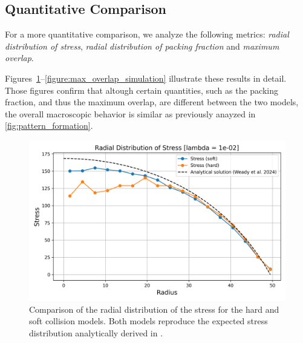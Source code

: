 \documentclass[conference]{IEEEtran}
\begin{document}
\cite{You2018}


\newpage

\subsection{Quantitative Comparison}

For a more quantitative comparison, we analyze the following metrics: \textit{radial distribution of stress}, \textit{radial distribution of packing fraction} and \textit{maximum overlap}.

Figures~\ref{figure:radial_distribution_stress}--\ref{figure:max_overlap_simulation} illustrate these results in detail. Those figures confirm that altough certain quantities, such as the packing fraction, and thus the maximum overlap, are different between the two models, the overall macroscopic behavior is similar as previously anayzed in \autoref{fig:pattern_formation}.


\begin{figure}[h]
    \centering
    \includegraphics[width=\linewidth]{figures/comparisons/radial_distribution_stress.png}
    \caption{Comparison of the radial distribution of the stress for the hard and soft collision models. Both models reproduce the expected stress distribution analytically derived in \cite{Weady2024}.}
    \label{figure:radial_distribution_stress}
\end{figure}
\end{document}
